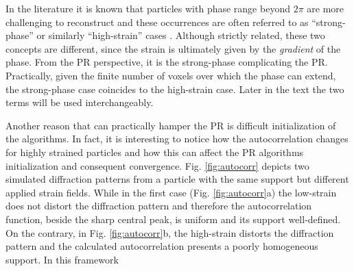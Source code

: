 In the literature it is known that particles with phase range beyond $2\pi$ are more challenging to reconstruct and these 
occurrences are often referred to as ``strong-phase'' or similarly ``high-strain'' cases \cite{Cha_2010, NewtonStrain_2010, Pavlov2017}. 
Although strictly related, 
these two concepts are different, since the strain is ultimately given by the \textit{gradient} of the phase. From the 
PR perspective, it is the strong-phase complicating the PR. Practically, given the finite number of voxels over which 
the phase can extend, the strong-phase case coincides to the high-strain case. Later in the text the two terms will be 
used interchangeably. 

Another reason that can practically hamper the PR is difficult initialization of the algorithms. In fact, it is 
interesting to notice how the autocorrelation changes for highly strained particles and
how this can affect the PR algorithms initialization and consequent convergence. Fig. \ref{fig:autocorr}
depicts two simulated diffraction patterns from a particle with the same support but different applied strain fields. 
While in the first case (Fig. \ref{fig:autocorr}a) the low-strain does not distort the diffraction pattern and therefore the autocorrelation 
function, beside the sharp central peak, is uniform and its support well-defined. On the contrary, in Fig. \ref{fig:autocorr}b, 
the high-strain distorts the diffraction pattern and the calculated autocorrelation presents a poorly homogeneous support. 
In this framework 

